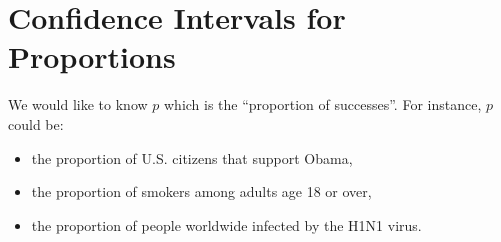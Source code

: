 \documentclass[captions=tableheading]{scrbook}
\begin{document}
\section{Confidence Intervals for Proportions}
\label{sec-9-4}
\label{sec-Confidence-Intervals-Proportions}


We would like to know \(p\) which is the ``proportion of successes''. For instance, \(p\) could be:
\begin{itemize}
\item the proportion of U.S. citizens that support Obama,
\item the proportion of smokers among adults age 18 or over,
\item the proportion of people worldwide infected by the H1N1 virus.
\end{itemize}
\end{document}
